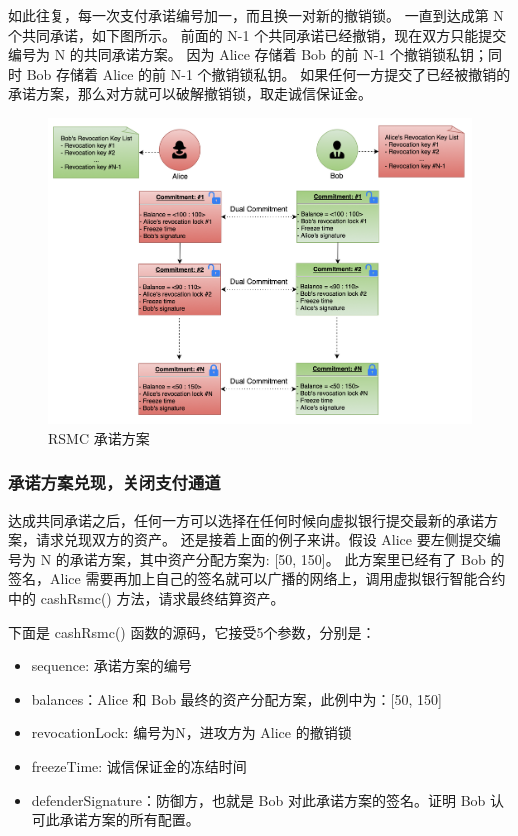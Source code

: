 \begin{appendices}
如此往复，每一次支付承诺编号加一，而且换一对新的撤销锁。
一直到达成第 N 个共同承诺，如下图所示。
前面的 N-1 个共同承诺已经撤销，现在双方只能提交编号为 N 的共同承诺方案。
因为 Alice 存储着 Bob 的前 N-1 个撤销锁私钥；同时 Bob 存储着 Alice 的前 N-1 个撤销锁私钥。
如果任何一方提交了已经被撤销的承诺方案，那么对方就可以破解撤销锁，取走诚信保证金。

\begin{figure}[h!]
    \centering
    \includegraphics[width=12cm, keepaspectratio]{../images/dual_rsmc_3.png}
    \caption{RSMC 承诺方案}
    \label{fig:rsmc_4}
\end{figure}

\subsubsection{承诺方案兑现，关闭支付通道}
达成共同承诺之后，任何一方可以选择在任何时候向虚拟银行提交最新的承诺方案，请求兑现双方的资产。
还是接着上面的例子来讲。假设 Alice 要左侧提交编号为 N 的承诺方案，其中资产分配方案为: [50, 150]。
此方案里已经有了 Bob 的签名，Alice 需要再加上自己的签名就可以广播的网络上，调用虚拟银行智能合约中的 cashRsmc() 方法，请求最终结算资产。

下面是 cashRsmc() 函数的源码，它接受5个参数，分别是：
\begin{itemize}
    \item sequence: 承诺方案的编号
    \item balances：Alice 和 Bob 最终的资产分配方案，此例中为：[50, 150]
    \item revocationLock: 编号为N，进攻方为 Alice 的撤销锁
    \item freezeTime: 诚信保证金的冻结时间
    \item defenderSignature：防御方，也就是 Bob 对此承诺方案的签名。证明 Bob 认可此承诺方案的所有配置。
\end{itemize}


\end{appendices}
